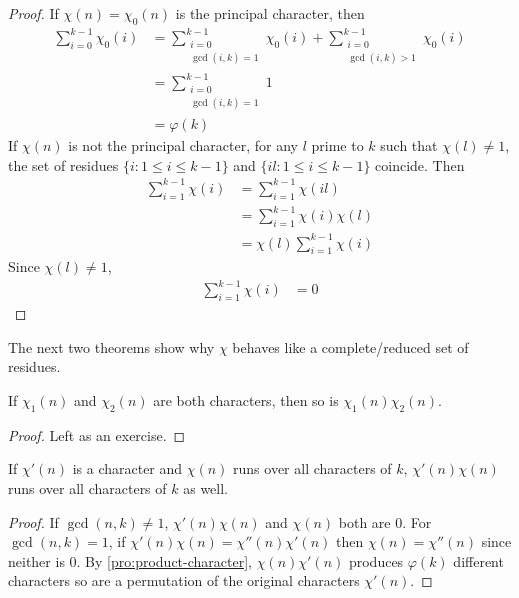 \documentclass[elemannt.tex]{subfile}
\begin{document}
		\begin{proof}
			If $\chi(n)=\chi_{0}(n)$ is the principal character, then
				\begin{align*}
					\sum_{i=0}^{k-1}\chi_{0}(i)
						& = \sum_{\substack{i=0\\\gcd(i,k)=1}}^{k-1}\chi_{0}(i)+\sum_{\substack{i=0\\\gcd(i,k)>1}}^{k-1}\chi_{0}(i)\\
						& = \sum_{\substack{i=0\\\gcd(i,k)=1}}^{k-1}1\\
						& = \varphi(k)
				\end{align*}
			If $\chi(n)$ is not the principal character, for any $l$ prime to $k$ such that $\chi(l)\neq1$, the set of residues $\{i: 1\leq i\leq k-1\}$ and $\{il:1\leq i\leq k-1\}$ coincide. Then
				\begin{align*}
					\sum_{i=1}^{k-1}\chi(i)
						& = \sum_{i=1}^{k-1}\chi(il)\\
						& = \sum_{i=1}^{k-1}\chi(i)\chi(l)\\
						& = \chi(l)\sum_{i=1}^{k-1}\chi(i)
				\end{align*}
			Since $\chi(l)\neq1$,
				\begin{align*}
					\sum_{i=1}^{k-1}\chi(i)
						& = 0
				\end{align*}
		\end{proof}
	The next two theorems show why $\chi$ behaves like a complete/reduced set of residues.
		\begin{proposition}\label{pro:product-character}
			If $\chi_{1}(n)$ and $\chi_{2}(n)$ are both characters, then so is $\chi_{1}(n)\chi_{2}(n)$.
		\end{proposition}

		\begin{proof}
			Left as an exercise.
		\end{proof}

		\begin{proposition}\label{pro:char-perm}
			If $\chi'(n)$ is a character and $\chi(n)$ runs over all characters of $k$, $\chi'(n)\chi(n)$ runs over all characters of $k$ as well.
		\end{proposition}

		\begin{proof}
			If $\gcd(n,k)\neq1$, $\chi'(n)\chi(n)$ and $\chi(n)$ both are $0$. For $\gcd(n,k)=1$, if $\chi'(n)\chi(n)=\chi''(n)\chi'(n)$ then $\chi(n)=\chi''(n)$ since neither is $0$. By \autoref{pro:product-character}, $\chi(n)\chi'(n)$ produces $\varphi(k)$ different characters so are a permutation of the original characters $\chi'(n)$.
		\end{proof}
\end{document}

